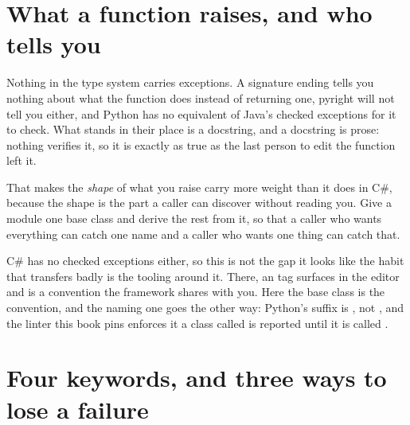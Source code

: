 \section{What a function raises, and who tells you}
\label{sec:ch06-contract}

Nothing in the type system carries exceptions. A signature ending
 tells you nothing about what the function does instead of
returning one, pyright will not tell you either, and Python has no
equivalent of Java's checked exceptions for it to check. What stands in
their place is a docstring, and a docstring is prose: nothing verifies it,
so it is exactly as true as the last person to edit the function left it.


\noindent
That makes the \emph{shape} of what you raise carry more weight than it does
in C\#, because the shape is the part a caller can discover without reading
you. Give a module one base class and derive the rest from it, so that a
caller who wants everything can catch one name and a caller who wants one
thing can catch that.


\begin{csbox}
C\# has no checked exceptions either, so this is not the gap it looks like
\dash{} the habit that transfers badly is the tooling around it. There, an
 tag surfaces in the editor and
 is a convention the framework shares with you.
Here the base class is the convention, and the naming one goes the other way:
Python's suffix is , not , and the linter this
book pins enforces it \dash{} a class called  is
reported until it is called .
\end{csbox}

\section{Four keywords, and three ways to lose a failure}
\label{sec:ch06-keywords}


